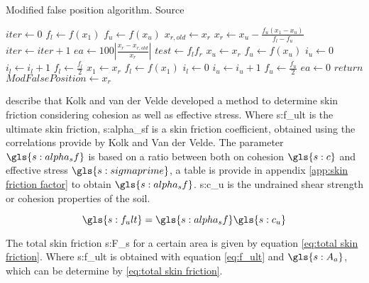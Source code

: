 \begin{algorithm}[!htb]
	\caption{Modified false position algorithm. Source \citet{chapra_numerical_2014}}\label{alg:modified false position}
	\begin{algorithmic}[1]
		\State $ iter \gets 0 $
		\State $ f_l \gets f(x_1) $
		\State $ f_u \gets f(x_u) $
		\State $ x_{r,old} \gets x_r $
		\State $ x_r \gets x_u - \frac{f_u (x_1 - x_u)}{f_l - f_u} $
		\State $ iter \gets iter + 1 $
		\State $ ea \gets 100|\frac{x_r - x_{r,old}}{x_r}| $
		\EndIf
		\State $ test \gets f_l f_r $
		\State $ x_u \gets x_r $
		\State $ f_u \gets f(x_u) $
		\State $ i_u \gets 0 $
		\State $ i_l \gets i_l + 1 $
		\State $ f_l \gets \frac{f_l}{2} $
		\EndIf
		\State $ x_1 \gets x_r $
		\State $ f_l \gets f(x_1) $
		\State $ i_l \gets 0 $
		\State $ i_u \gets i_u + 1 $
		\State $ f_u \gets \frac{f_u}{2} $
		\EndIf
		\Else
		\State $ ea \gets 0 $
		\EndIf
		\State $ return $
		\EndIf
		\EndWhile
		\State $ ModFalsePosition \gets x_r $
		\EndProcedure
	\end{algorithmic}
\end{algorithm}

\citet{rajapakse_geotechnical_2011} describe that Kolk and van der Velde developed a method to determine skin friction considering cohesion as well as effective stress. Where \gls{s:f_ult} is the ultimate skin friction, \gls{s:alpha_sf} is a skin friction coefficient, obtained using the correlations provide by Kolk and Van der Velde. The parameter $ \gls{s:alpha_sf} $ is based on a ratio between both on cohesion $ \gls{s:c} $ and effective stress $ \gls{s:sigmaprime} $, a table is provide in appendix \ref{app:skin friction factor} to obtain $ \gls{s:alpha_sf} $.  \gls{s:c_u} is the undrained shear strength or cohesion properties of the soil.

\begin{sBox}
	\begin{equation}\label{eq:f_ult}
		\gls{s:f_ult} = \gls{s:alpha_sf} \gls{s:c_u}
	\end{equation}
\end{sBox}

\noindent The total skin friction \gls{s:F_s} for a certain area is given by equation \ref{eq:total skin friction}. Where \gls{s:f_ult} is obtained with equation \ref{eq:f_ult} and  $ \gls{s:A_a} $, which can be determine by \ref{eq:total skin friction}.

